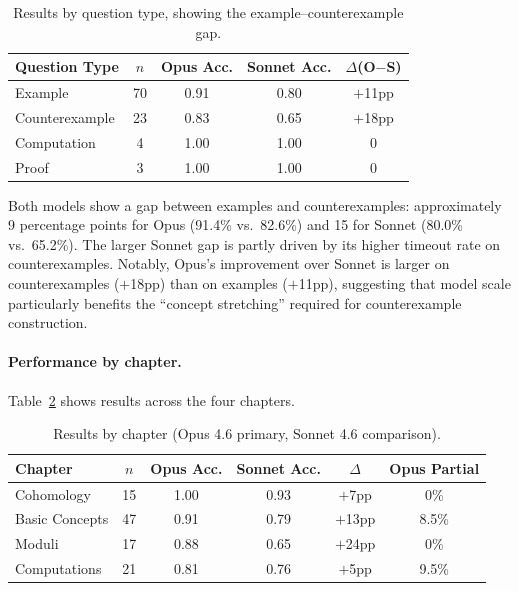 \begin{table}[ht]
\centering
\caption{Results by question type, showing the example--counterexample gap.}
\label{tab:pilot-by-type}
\begin{tabular}{lcccc}
\toprule
\textbf{Question Type} & \textbf{$n$} & \textbf{Opus Acc.} & \textbf{Sonnet Acc.} & \textbf{$\Delta$(O$-$S)} \\
\midrule
Example & 70 & 0.91 & 0.80 & $+$11pp \\
Counterexample & 23 & 0.83 & 0.65 & $+$18pp \\
Computation & 4 & 1.00 & 1.00 & 0 \\
Proof & 3 & 1.00 & 1.00 & 0 \\
\bottomrule
\end{tabular}
\end{table}

Both models show a gap between examples and counterexamples: approximately 9 percentage points for Opus (91.4\% vs.\ 82.6\%) and 15 for Sonnet (80.0\% vs.\ 65.2\%).
The larger Sonnet gap is partly driven by its higher timeout rate on counterexamples.
Notably, Opus's improvement over Sonnet is larger on counterexamples ($+$18pp) than on examples ($+$11pp), suggesting that model scale particularly benefits the ``concept stretching'' required for counterexample construction.

\paragraph{Performance by chapter.}
Table~\ref{tab:pilot-by-chapter} shows results across the four chapters.

\begin{table}[ht]
\centering
\caption{Results by chapter (Opus 4.6 primary, Sonnet 4.6 comparison).}
\label{tab:pilot-by-chapter}
\begin{tabular}{lccccc}
\toprule
\textbf{Chapter} & \textbf{$n$} & \textbf{Opus Acc.} & \textbf{Sonnet Acc.} & $\Delta$ & \textbf{Opus Partial} \\
\midrule
Cohomology & 15 & 1.00 & 0.93 & $+$7pp & 0\% \\
Basic Concepts & 47 & 0.91 & 0.79 & $+$13pp & 8.5\% \\
Moduli & 17 & 0.88 & 0.65 & $+$24pp & 0\% \\
Computations & 21 & 0.81 & 0.76 & $+$5pp & 9.5\% \\
\bottomrule
\end{tabular}
\end{table}


